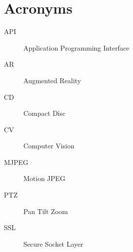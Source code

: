 \documentclass[main.tex]{subfiles}
\begin{document}
\chapter{Acronyms}
\begin{description}
\item[API] Application Programming Interface
\item[AR] Augmented Reality
\item[CD] Compact Disc
\item[CV] Computer Vision
\item[MJPEG] Motion JPEG
\item[PTZ] Pan Tilt Zoom
\item[SSL] Secure Socket Layer
\end{description}
\end{document}
